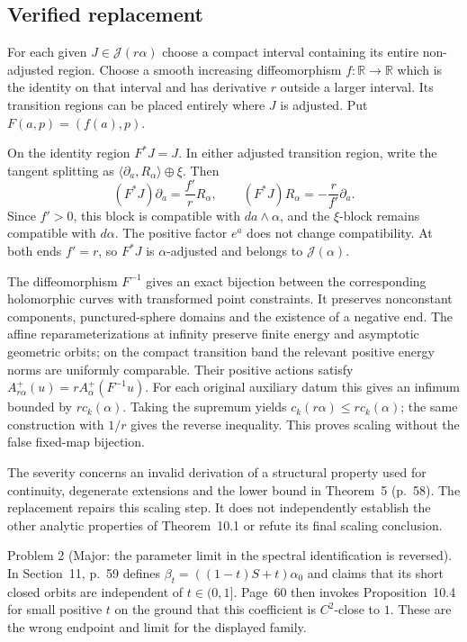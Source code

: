 \documentclass[10pt]{article}
\begin{document}
\subsection*{Verified replacement}
For each given \(J\in\mathcal J(r\alpha)\) choose a compact interval containing its entire non-adjusted region. Choose a smooth increasing diffeomorphism \(f:\mathbb R\to\mathbb R\) which is the identity on that interval and has derivative \(r\) outside a larger interval. Its transition regions can be placed entirely where \(J\) is adjusted. Put \(F(a,p)=(f(a),p)\).\par
On the identity region \(F^*J=J\). In either adjusted transition region, write the tangent splitting as \(\langle\partial_a,R_\alpha\rangle\oplus\xi\). Then \[(F^*J)\partial_a=\frac{f'}r R_\alpha,
 \qquad (F^*J)R_\alpha=-\frac r{f'}\partial_a.\] Since \(f'>0\), this block is compatible with \(da\wedge\alpha\), and the \(\xi\)-block remains compatible with \(d\alpha\). The positive factor \(e^a\) does not change compatibility. At both ends \(f'=r\), so \(F^*J\) is \(\alpha\)-adjusted and belongs to \(\mathcal J(\alpha)\).\par
The diffeomorphism \(F^{-1}\) gives an exact bijection between the corresponding holomorphic curves with transformed point constraints. It preserves nonconstant components, punctured-sphere domains and the existence of a negative end. The affine reparameterizations at infinity preserve finite energy and asymptotic geometric orbits; on the compact transition band the relevant positive energy norms are uniformly comparable. Their positive actions satisfy \(A^+_{r\alpha}(u)=r A^+_\alpha(F^{-1}u)\). For each original auxiliary datum this gives an infimum bounded by \(r c_k(\alpha)\). Taking the supremum yields \(c_k(r\alpha)\le r c_k(\alpha)\); the same construction with \(1/r\) gives the reverse inequality. This proves scaling without the false fixed-map bijection.\par
The severity concerns an invalid derivation of a structural property used for continuity, degenerate extensions and the lower bound in Theorem 5 (p. 58). The replacement repairs this scaling step. It does not independently establish the other analytic properties of Theorem 10.1 or refute its final scaling conclusion.\par
Problem 2 (Major: the parameter limit in the spectral identification is reversed).  In Section 11, p. 59 defines \(\beta_t=((1-t)S+t)\alpha_0\) and claims that its short closed orbits are independent of \(t\in(0,1]\). Page 60 then invokes Proposition 10.4 for small positive \(t\) on the ground that this coefficient is \(C^2\)-close to \(1\). These are the wrong endpoint and limit for the displayed family.\par
\end{document}

